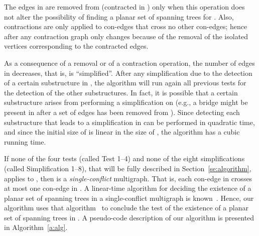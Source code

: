 \documentclass[letter,runningheads]{llncs}
\begin{document}
The edges in  are removed from  (contracted in ) only when this operation does not alter the possibility of finding a planar set of spanning trees for . Also, contractions are only applied to con-edges that cross no other con-edges; hence after any contraction graph  only changes because of the removal of the isolated vertices corresponding to the contracted edges.

As a consequence of a removal or of a contraction operation, the number of edges in  decreases, that is,  is ``simplified''. After any simplification due to the detection of a certain substructure in , the algorithm will run again all previous tests for the detection of the other substructures. In fact, it is possible that a certain substructure arises from performing a simplification on  (e.g., a bridge might be present in  after a set of edges has been removed from ). Since detecting each substructure that leads to a simplification in  can be performed in quadratic time, and since the initial size of  is linear in the size of , the algorithm has a cubic running time.

If none of the four tests (called {\sc Test 1--4}) and none of the eight simplifications (called {\sc Simplification 1--8}), that will be fully described in Section~\ref{se:algorithm}, applies to , then  is a {\em single-conflict} multigraph. That is, each con-edge in  crosses at most one con-edge in . A linear-time algorithm for deciding the existence of a planar set of spanning trees in a single-conflict multigraph  is known~\cite{df-ectefcgsf-09}. Hence, our algorithm uses that algorithm~\cite{df-ectefcgsf-09} to conclude the test of the existence of a planar set of spanning trees in . A pseudo-code description of our algorithm is presented in Algorithm~\ref{a:alg}.
\end{document}
